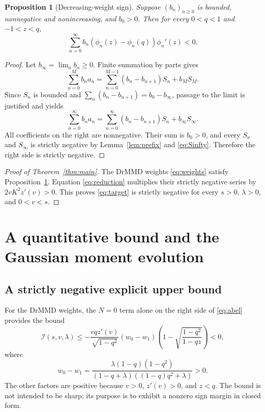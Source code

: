 \documentclass[11pt]{article}
\newtheorem{proposition}[theorem]{Proposition}
\theoremstyle{remark}
\newcommand{\Ical}{\mathcal I}
\begin{document}
\begin{proposition}[Decreasing-weight sign]\label{prop:weights}
Suppose $(b_n)_{n\ge0}$ is bounded, nonnegative and nonincreasing, and $b_0>0$.
Then for every $0<q<1$ and $-1<z<q$,
\[
 \sum_{n=0}^\infty b_n(\phi_n(z)-\phi_n(q))\phi_n'(z)<0.
\]
\end{proposition}
\begin{proof}
Let $b_\infty=\lim_n b_n\ge0$.
Finite summation by parts gives
\[
 \sum_{n=0}^M b_na_n
 =\sum_{n=0}^{M-1}(b_n-b_{n+1})S_n+b_MS_M.
\]
Since $S_n$ is bounded and $\sum_n(b_n-b_{n+1})=b_0-b_\infty$, passage to the limit is justified and yields
\begin{equation}\label{eq:abel}
 \sum_{n=0}^\infty b_na_n
 =\sum_{n=0}^\infty(b_n-b_{n+1})S_n+b_\infty S_\infty.
\end{equation}
All coefficients on the right are nonnegative. Their sum is $b_0>0$, and every $S_n$ and $S_\infty$ is strictly negative by Lemma~\ref{lem:prefix} and \eqref{eq:Sinfty}. Therefore the right side is strictly negative.
\end{proof}

\begin{proof}[Proof of Theorem~\ref{thm:main}]
The DrMMD weights \eqref{eq:weights} satisfy Proposition~\ref{prop:weights}.
Equation \eqref{eq:reduction} multiplies their strictly negative series by $2vK^2z'(v)>0$. This proves \eqref{eq:target} is strictly negative for every $s>0$, $\lambda>0$, and $0<v<s$.
\end{proof}

\section{A quantitative bound and the Gaussian moment evolution}
\subsection{A strictly negative explicit upper bound}
For the DrMMD weights, the $N=0$ term alone on the right side of \eqref{eq:abel} provides the bound
\begin{equation}\label{eq:quantbound}
 \Ical(s,v,\lambda)\le
 -\frac{v q z'(v)}{\sqrt{1-q^2}}(w_0-w_1)
 \left(1-\sqrt{\frac{1-q^2}{1-qz}}\right)<0,
\end{equation}
where
\[
 w_0-w_1=
 \frac{\lambda(1-q)(1-q^2)}{(1-q+\lambda)((1-q)q^2+\lambda)}>0.
\]
The other factors are positive because $v>0$, $z'(v)>0$, and $z<q$.
The bound is not intended to be sharp; its purpose is to exhibit a nonzero sign margin in closed form.
\end{document}
